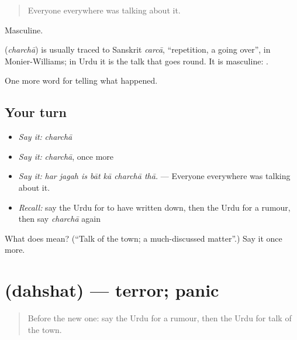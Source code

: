 \begin{quote}
Everyone everywhere was talking about it.
\end{quote}

Masculine.

\begin{cousinweb}
\textbf{} (\emph{charchā}) is usually traced to Sanskrit \emph{carcā}, \textquotedblleft{}repetition, a going over\textquotedblright{}, in Monier-Williams; in Urdu it is the talk that goes round. It is masculine: \textbf{ }.
\end{cousinweb}

\begin{grammarlens}[title={What you've built}]
One more word for telling what happened.
\end{grammarlens}

\subsection*{Your turn}
\begin{itemize}
\raggedright
  \item \emph{Say it:} \emph{charchā}
  \item \emph{Say it:} \emph{charchā}, once more
  \item \emph{Say it:} \emph{har jagah is bāt kā charchā thā.} — Everyone everywhere was talking about it.
  \item \emph{Recall:} say the Urdu for to have written down, then the Urdu for a rumour, then say \emph{charchā} again
\end{itemize}

\begin{tcolorbox}[breakable,colback=teal!4,colframe=teal!35!black,title={Before you move on}]
What does  mean? (\textquotedblleft{}Talk of the town; a much-discussed matter\textquotedblright{}.) Say it once more.
\end{tcolorbox}
\section[\texorpdfstring{\ur{دہشت} (dahshat)}{دہشت (dahshat)}]{ (dahshat) — terror; panic}

\label{lesson:UR-C302-dahshat}



\begin{quote}
Before the new one: say the Urdu for a rumour, then the Urdu for talk of the town.
\end{quote}

